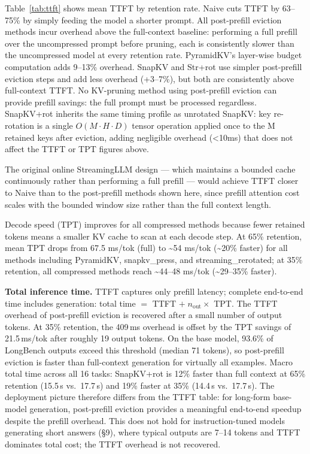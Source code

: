 \documentclass[10pt,letterpaper]{article}
\begin{document}
Table~\ref{tab:ttft} shows mean TTFT by retention rate.
Naive cuts TTFT by 63--75\% by simply feeding the model a shorter
prompt. All post-prefill eviction methods incur overhead above the
full-context baseline: performing a full prefill over the uncompressed
prompt before pruning, each is consistently slower than the uncompressed
model at every retention rate. PyramidKV's layer-wise budget computation
adds 9--13\% overhead. SnapKV and Str+rot use simpler
post-prefill eviction steps and add less overhead (+3--7\%), but both
are consistently above full-context TTFT. No KV-pruning method using
post-prefill eviction can provide prefill savings: the full prompt must
be processed regardless. SnapKV+rot inherits the same timing profile as
unrotated SnapKV: key re-rotation is a single \(O(M \cdot H \cdot D)\)
tensor operation applied once to the M retained keys after eviction,
adding negligible overhead (\textless10ms) that does not affect the TTFT
or TPT figures above.

The original online StreamingLLM design --- which
maintains a bounded cache continuously rather than performing a full
prefill --- would achieve TTFT closer to Naive than to the post-prefill
methods shown here, since prefill attention cost scales with the bounded
window size rather than the full context length.

Decode speed (TPT) improves for all compressed methods because
fewer retained tokens means a smaller KV cache to scan at each decode
step. At 65\% retention, mean TPT drops from 67.5 ms/tok (full) to
\textasciitilde54 ms/tok (\textasciitilde20\% faster) for all methods
including PyramidKV, snapkv\_press, and streaming\_rerotated; at 35\%
retention, all compressed methods reach \textasciitilde44--48 ms/tok
(\textasciitilde29--35\% faster).

\textbf{Total inference time.} TTFT captures only prefill latency;
complete end-to-end time includes generation: total time \(=\) TTFT
\(+\;n_{\text{out}} \times\) TPT. The TTFT overhead of post-prefill
eviction is recovered after a small number of output tokens. At 35\%
retention, the 409\,ms overhead is offset by the TPT savings of
21.5\,ms/tok after roughly 19 output tokens. On the base model,
93.6\% of LongBench outputs exceed this threshold (median 71 tokens),
so post-prefill eviction is faster than full-context generation for
virtually all examples. Macro total time across all 16 tasks:
SnapKV+rot is 12\% faster than full context at 65\% retention
(15.5\,s vs.\ 17.7\,s) and 19\% faster at 35\% (14.4\,s
vs.\ 17.7\,s). The deployment picture therefore differs from the TTFT
table: for long-form base-model generation, post-prefill eviction
provides a meaningful end-to-end speedup despite the prefill overhead.
This does not hold for instruction-tuned models generating short
answers (§9), where typical outputs are 7--14 tokens and TTFT
dominates total cost; the TTFT overhead is not recovered.
\end{document}
